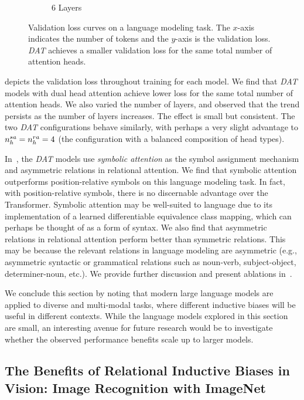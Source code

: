 \begin{figure}[ht]
\begin{subfigure}{0.33\textwidth}
        \caption{6 Layers}
    \end{subfigure}
    \caption{Validation loss curves on a language modeling task. The $x$-axis indicates the number of tokens and the $y$-axis is the validation loss. \textit{DAT} achieves a smaller validation loss for the same total number of attention heads.}\label{fig:tiny_stories_val_loss_curves}
\end{figure}

 depicts the validation loss throughout training for each model. We find that \textit{DAT} models with dual head attention achieve lower loss for the same total number of attention heads. We also varied the number of layers, and observed that the trend persists as the number of layers increases. The effect is small but consistent. The two \textit{DAT} configurations behave similarly, with perhaps a very slight advantage to $n_h^{sa} = n_h^{ra} = 4$ (the configuration with a balanced composition of head types).

In~, the \textit{DAT} models use \textit{symbolic attention} as the symbol assignment mechanism and asymmetric relations in relational attention. We find that symbolic attention outperforms position-relative symbols on this language modeling task. In fact, with position-relative symbols, there is no discernable advantage over the Transformer. Symbolic attention may be well-suited to language due to its implementation of a learned differentiable equivalence class mapping, which can perhaps be thought of as a form of syntax. We also find that asymmetric relations in relational attention perform better than symmetric relations. This may be because the relevant relations in language modeling are asymmetric (e.g., asymmetric syntactic or grammatical relations such as noun-verb, subject-object, determiner-noun, etc.). We provide further discussion and present ablations in~.

We conclude this section by noting that modern large language models are applied to diverse and multi-modal tasks, where different inductive biases will be useful in different contexts. While the language models explored in this section are small, an interesting avenue for future research would be to investigate whether the observed performance benefits scale up to larger models.

\subsection{The Benefits of Relational Inductive Biases in Vision: Image Recognition with ImageNet}\label{ssec:imagenet}

